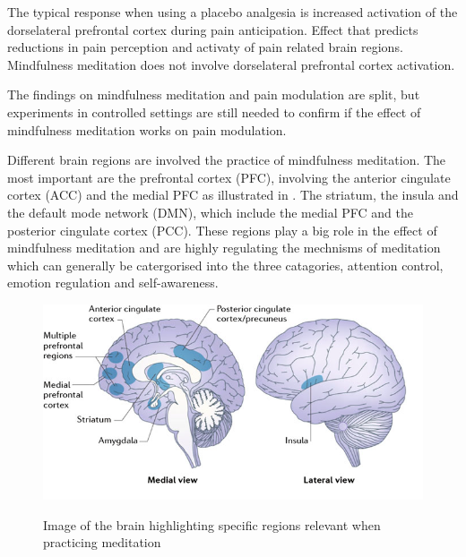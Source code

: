 The typical response when using a placebo analgesia is increased activation of the dorselateral prefrontal cortex during pain anticipation. Effect that predicts reductions in pain perception and activaty of pain related brain regions. Mindfulness meditation does not involve dorselateral prefrontal cortex activation. \cite{Zeidan2012}

The findings on mindfulness meditation and pain modulation are split, but experiments in controlled settings are still needed to confirm if the effect of mindfulness meditation works on pain modulation. \cite{Zeidan2012, Perlman2010}



Different brain regions are involved the practice of mindfulness meditation. The most important are the prefrontal cortex (PFC), involving the anterior cingulate cortex (ACC) and the medial PFC as illustrated in . The striatum, the insula and the default mode network (DMN), which include the medial PFC and the posterior cingulate cortex (PCC). These regions play a big role in the effect of mindfulness meditation and are highly regulating the mechnisms of meditation which can generally be catergorised into the three catagories, attention control, emotion regulation and self-awareness. 


\begin{figure}[H]
	\includegraphics[width=1\textwidth]{figures/brain_meditation.png} 
	\caption{Image of the brain highlighting specific regions relevant when practicing meditation}
	\label{fig:brain_meditation}  
	\cite{Tang2017}
\end{figure}   

